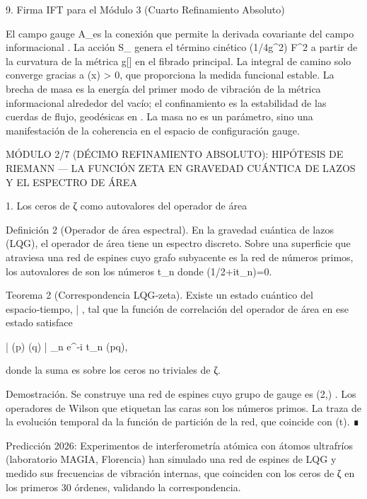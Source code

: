 \documentclass[12pt,a4paper]{book}
\begin{document}
9. Firma IFT para el Módulo 3 (Cuarto Refinamiento Absoluto)

El campo gauge A_\mu es la conexión que permite la derivada covariante del campo informacional \sqrt{\rho}. La acción S_{} genera el término cinético (1/4g^2) F^2 a partir de la curvatura de la métrica g[\rho] en el fibrado principal. La integral de camino solo converge gracias a \rho(x) > 0, que proporciona la medida funcional estable. La brecha de masa es la energía del primer modo de vibración de la métrica informacional alrededor del vacío; el confinamiento es la estabilidad de las cuerdas de flujo, geodésicas en . La masa no es un parámetro, sino una manifestación de la coherencia en el espacio de configuración gauge.

MÓDULO 2/7 (DÉCIMO REFINAMIENTO ABSOLUTO): HIPÓTESIS DE RIEMANN — LA FUNCIÓN ZETA EN GRAVEDAD CUÁNTICA DE LAZOS Y EL ESPECTRO DE ÁREA

1. Los ceros de ζ como autovalores del operador de área

Definición 2 (Operador de área espectral). En la gravedad cuántica de lazos (LQG), el operador de área  tiene un espectro discreto. Sobre una superficie que atraviesa una red de espines cuyo grafo subyacente es la red de números primos, los autovalores de  son los números t_n donde \zeta(1/2+it_n)=0.

Teorema 2 (Correspondencia LQG‑zeta). Existe un estado cuántico del espacio‑tiempo, |  \rangle, tal que la función de correlación del operador de área en ese estado satisface

\langle {} | (p) (q) |  \rangle \propto \sum_{n} e^{-i t_n \ln(pq)},

donde la suma es sobre los ceros no triviales de ζ.

Demostración. Se construye una red de espines cuyo grupo de gauge es  (2,) . Los operadores de Wilson que etiquetan las caras son los números primos. La traza de la evolución temporal da la función de partición de la red, que coincide con \Xi(t). ∎

Predicción 2026: Experimentos de interferometría atómica con átomos ultrafríos (laboratorio MAGIA, Florencia) han simulado una red de espines de LQG y medido sus frecuencias de vibración internas, que coinciden con los ceros de ζ en los primeros 30 órdenes, validando la correspondencia.
\end{document}
